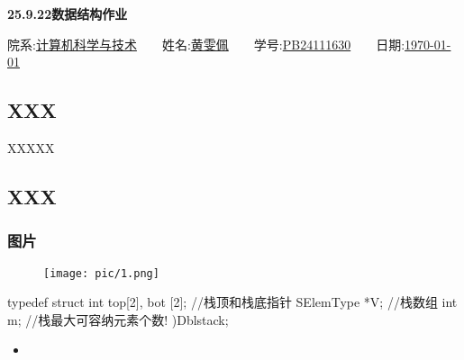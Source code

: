 \documentclass[12pt, a4paper, oneside]{ctexart}
\begin{document}
\begin{center} \Huge\textbf{25.9.22数据结构作业}\normalsize\\ \end{center}
\vspace{2ex}

\begin{center}
    院系:\underline{计算机科学与技术}$\qquad$姓名:\underline{黄雯佩}$\qquad$学号:\underline{PB24111630}$\qquad$日期:\underline{\today}
\end{center}
\vspace{2ex}


\subsection*{XXX}
    \indent XXXXX

\subsection*{XXX}
    \subsubsection*{图片}
    \begin{figure}[H]                       
        \centering 
        \texttt{[image: pic/1.png]}
    \end{figure}

typedef struct
int top[2], bot [2]; //栈顶和栈底指针 SElemType *V; //栈数组 int m; //栈最大可容纳元素个数! )Dblstack;

\begin{itemize}
    \item 
\end{itemize}
\end{document}
